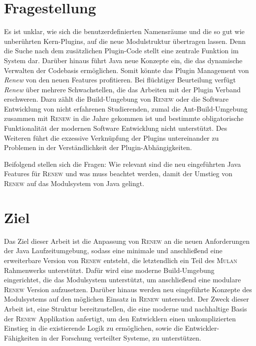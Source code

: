 \section{Fragestellung} \label{sec:KdS}
	Es ist unklar, wie sich die benutzerdefinierten Namensräume und die so gut wie unberührten Kern-Plugins, auf die neue Modulstruktur übertragen lassen. Denn die Suche nach dem zusätzlichen Plugin-Code stellt eine zentrale Funktion im System dar.\newline
	Darüber hinaus führt Java neue Konzepte ein, die das dynamische Verwalten der Codebasis ermöglichen. Somit könnte das Plugin Management von \textit{Renew} von den neuen Features profitieren. \bigbreak
	Bei flüchtiger Beurteilung verfügt \textit{Renew} über mehrere Schwachstellen, die das Arbeiten mit der Plugin Verband erschweren. Dazu zählt die Build-Umgebung von \textsc{Renew} oder die Software Entwicklung von nicht erfahrenen Studierenden, zumal die Ant-Build-Umgebung zusammen mit \textsc{Renew} in die Jahre gekommen ist und bestimmte obligatorische Funktionalität der modernen Software Entwicklung nicht unterstützt. Des Weiteren führt die exzessive Verknüpfung der Plugins untereinander zu Problemen in der Verständlichkeit der Plugin-Abhängigkeiten.\bigbreak

	Beifolgend stellen sich die Fragen: Wie relevant sind die neu eingeführten Java Features für \textsc{Renew} und was muss beachtet werden, damit der Umstieg von \textsc{Renew} auf das Modulsystem von Java gelingt.

\section{Ziel} \label{sec:Z}
	Das Ziel dieser Arbeit ist die Anpassung von \textsc{Renew} an die neuen Anforderungen der Java Laufzeitumgebung, sodass eine minimale und anschließend eine erweiterbare Version von \textsc{Renew} entsteht, die letztendlich ein Teil des \textsc{Mulan} Rahmenwerks unterstützt. Dafür wird eine moderne Build-Umgebung eingerichtet, die das Modulsystem unterstützt, um anschließend eine modulare \textsc{Renew} Version aufzusetzen. Darüber hinaus werden neu eingeführte Konzepte des Modulsystems auf den möglichen Einsatz in \textsc{Renew} untersucht. \newline
	Der Zweck dieser Arbeit ist, eine Struktur bereitzustellen, die eine moderne und nachhaltige Basis der \textsc{Renew} Applikation anfertigt, um den Entwicklern einen unkomplizierten Einstieg in die existierende Logik zu ermöglichen, sowie die Entwickler-Fähigkeiten in der Forschung verteilter Systeme, zu unterstützen.\bigbreak


